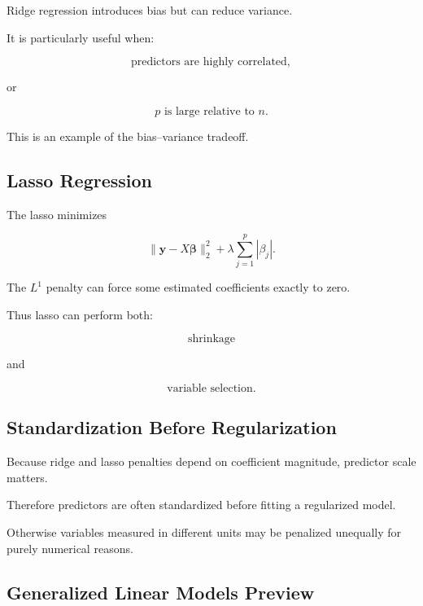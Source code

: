 Ridge regression introduces bias but can reduce variance.

It is particularly useful when:

\[
\boxed{
\text{predictors are highly correlated},
}
\]

or

\[
\boxed{
p
\text{ is large relative to }n.
}
\]

This is an example of the bias--variance tradeoff.

\subsection{Lasso Regression}
\label{subsec:lasso-regression}

The lasso minimizes

\[
\boxed{
\|\mathbf{y}-X\boldsymbol{\beta}\|_2^2
+
\lambda
\sum_{j=1}^{p}
|\beta_j|.
}
\]

The \(L^1\) penalty can force some estimated coefficients exactly to
zero.

Thus lasso can perform both:

\[
\boxed{
\text{shrinkage}
}
\]

and

\[
\boxed{
\text{variable selection}.
}
\]

\subsection{Standardization Before Regularization}
\label{subsec:standardization-regularization}

Because ridge and lasso penalties depend on coefficient magnitude,
predictor scale matters.

Therefore predictors are often standardized before fitting a regularized
model.

Otherwise variables measured in different units may be penalized
unequally for purely numerical reasons.

\subsection{Generalized Linear Models Preview}
\label{subsec:glm-preview}

